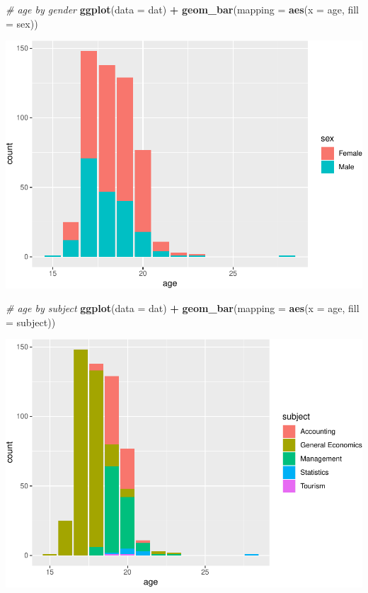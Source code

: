 \documentclass[]{article}
\newenvironment{Shaded}{\begin{snugshade}}{\end{snugshade}}
\newcommand{\CommentTok}[1]{\textcolor[rgb]{0.56,0.35,0.01}{\textit{#1}}}
\newcommand{\DataTypeTok}[1]{\textcolor[rgb]{0.13,0.29,0.53}{#1}}
\newcommand{\KeywordTok}[1]{\textcolor[rgb]{0.13,0.29,0.53}{\textbf{#1}}}
\newcommand{\NormalTok}[1]{#1}
\newcommand{\OperatorTok}[1]{\textcolor[rgb]{0.81,0.36,0.00}{\textbf{#1}}}
\newcommand{\StringTok}[1]{\textcolor[rgb]{0.31,0.60,0.02}{#1}}
\begin{document}
\begin{Shaded}
\begin{Highlighting}[]
\CommentTok{# age by gender}
\KeywordTok{ggplot}\NormalTok{(}\DataTypeTok{data =}\NormalTok{ dat) }\OperatorTok{+}\StringTok{ }
\StringTok{  }\KeywordTok{geom_bar}\NormalTok{(}\DataTypeTok{mapping =} \KeywordTok{aes}\NormalTok{(}\DataTypeTok{x =}\NormalTok{ age, }\DataTypeTok{fill =}\NormalTok{ sex))}
\end{Highlighting}
\end{Shaded}

\includegraphics{StudentGoals_files/figure-latex/unnamed-chunk-11-8.pdf}

\begin{Shaded}
\begin{Highlighting}[]
\CommentTok{# age by subject}
\KeywordTok{ggplot}\NormalTok{(}\DataTypeTok{data =}\NormalTok{ dat) }\OperatorTok{+}\StringTok{ }
\StringTok{  }\KeywordTok{geom_bar}\NormalTok{(}\DataTypeTok{mapping =} \KeywordTok{aes}\NormalTok{(}\DataTypeTok{x =}\NormalTok{ age, }\DataTypeTok{fill =}\NormalTok{ subject))}
\end{Highlighting}
\end{Shaded}

\includegraphics{StudentGoals_files/figure-latex/unnamed-chunk-11-9.pdf}
\end{document}
